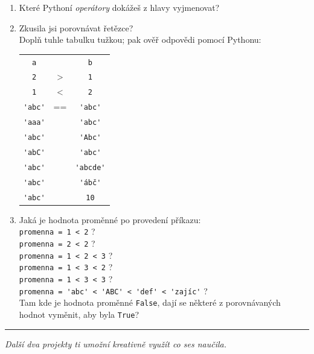 \documentclass[a4paper,10pt]{article}
\newcommand\True{\texttt{True}}
\newcommand\False{\texttt{False}}
\newcommand\startsection[1]{
     \vspace{0.2ex}
    \hrule
    {\fontspec{Oxygen} \tiny
     \vspace{-1ex}
     \emph{#1}
     \vspace{-1.5em}
    }
}
\begin{document}
\begin{enumerate}[resume]

\item Které Pythoní \emph{operátory} dokážeš z hlavy vyjmenovat?

\item Zkusila jsi porovnávat řetězce?
    \\Doplň tuhle tabulku tužkou; pak ověř odpovědi pomocí Pythonu:

    {
        \newcommand\rowend{\rule{0pt}{0.5cm}\\ \hline}
        \begin{tabular}{c|c|c}
        \arrayrulecolor{silver}
        \verb+a+ &  & \verb+b+ \\
        \arrayrulecolor{black}\hline\arrayrulecolor{silver}
        \verb+2+ & > & \verb+1+ \rowend
        \verb+1+ & < & \verb+2+ \rowend
        \verb+'abc'+ & == & \verb+'abc'+ \rowend
        \verb+'aaa'+ &    & \verb+'abc'+ \rowend
        \verb+'abc'+ &    & \verb+'Abc'+ \rowend
        \verb+'abC'+ &    & \verb+'abc'+ \rowend
        \verb+'abc'+ &    & \verb+'abcde'+ \rowend
        \verb+'abc'+ &    & \verb+'ábč'+ \rowend
        \verb+'abc'+ &    & \verb+10+ \rowend
        \end{tabular}
    }

\item Jaká je hodnota proměnné po provedení příkazu:
    \\\verb+promenna = 1 < 2+ \hspace{0.2cm}?
    \\\verb+promenna = 2 < 2+ \hspace{0.2cm}?
    \\\verb+promenna = 1 < 2 < 3+ \hspace{0.2cm}?
    \\\verb+promenna = 1 < 3 < 2+ \hspace{0.2cm}?
    \\\verb+promenna = 1 < 3 < 3+ \hspace{0.2cm}?
    \\\verb+promenna = 'abc' < 'ABC' < 'def' < 'zajíc'+ \hspace{0.2cm}?
    \\Tam kde je hodnota proměnné \False, dají se některé z porovnávaných hodnot vyměnit, aby byla \True?

\end{enumerate}

\startsection{Další dva projekty ti umožní kreativně využít co ses naučila.}
\end{document}
